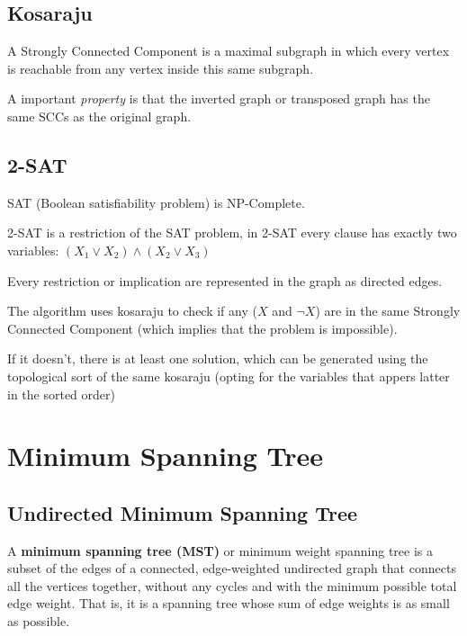 
    \vspace{5pts}
	
	\subsection{Kosaraju}

	A Strongly Connected Component is a maximal subgraph in which every vertex is reachable
	from any vertex inside this same subgraph.

	A important \textit{property} is that the inverted graph or transposed graph has the same SCCs
	as the original graph.


	\subsection{2-SAT}
	
		SAT (Boolean satisfiability problem) is NP-Complete.

		2-SAT is a restriction of the SAT problem, in 2-SAT every clause has exactly two variables:
		$ (X_1 \vee X_2) \wedge (X_2 \vee X_3) $

		Every restriction or implication are represented in the graph as directed edges.

		The algorithm uses kosaraju to check if any ($X$ and $\neg{X}$) are in the same Strongly Connected Component 
		(which implies that the problem is impossible). 

		If it doesn't, there is at least one solution, which can be generated using the topological sort of the same kosaraju 
		(opting for the variables that appers latter in the sorted order)


\section{Minimum Spanning Tree}

\subsection{Undirected Minimum Spanning Tree}

	A \textbf{minimum spanning tree (MST)} or minimum weight spanning tree is a subset of the edges
	of a connected, edge-weighted undirected graph that connects all the vertices together,
	without any cycles and with the minimum possible total edge weight.
	That is, it is a spanning tree whose sum of edge weights is as small as possible.

